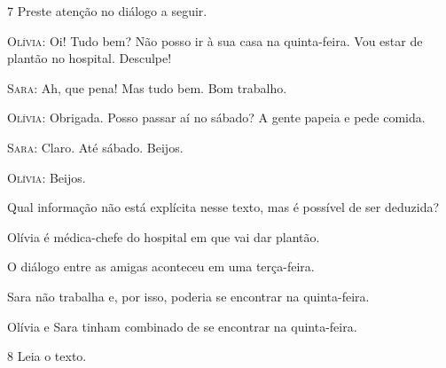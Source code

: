 \num{7} Preste atenção no diálogo a seguir.

\begin{myquote}
\textsc{ }

\textsc{Olívia}: Oi! Tudo bem? Não posso ir à sua casa na quinta-feira. Vou estar de plantão
no hospital. Desculpe!

\textsc{Sara}: Ah, que pena! Mas tudo bem. Bom trabalho.

\textsc{Olívia}: Obrigada. Posso passar aí no sábado? A gente papeia e pede comida.

\textsc{Sara}: Claro. Até sábado. Beijos.

\textsc{Olívia}: Beijos.

\end{myquote}

Qual informação não está explícita nesse texto, mas é possível de ser
deduzida?

\begin{escolha}
\item Olívia é médica-chefe do hospital em que vai dar plantão.

\item O diálogo entre as amigas aconteceu em uma terça-feira.

\item Sara não trabalha e, por isso, poderia se encontrar na quinta-feira.

\item Olívia e Sara tinham combinado de se encontrar na quinta-feira.
\end{escolha}


\num{8} Leia o texto.

